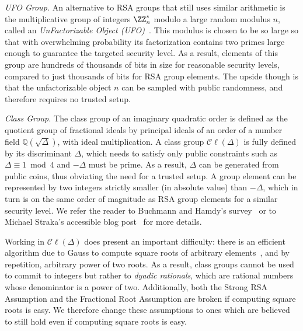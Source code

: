\documentclass{article}
\theoremstyle{definition}
\begin{document}
\textit{UFO Group.} An alternative to RSA groups that still uses similar arithmetic is the multiplicative group of integers $\ZZ_n^*$ modulo a large random modulus $n$, called an \emph{UnFactorizable Object (UFO)}~\cite{conf/icics/Sander99}. This modulus is chosen to be so large so that with overwhelming probability its factorization contains two primes large enough to guarantee the targeted security level. As a result, elements of this group are hundreds of thousands of bits in size for reasonable security levels, compared to just thousands of bits for RSA group elements. The upside though is that the unfactorizable object $n$ can be sampled with public randomness, and therefore requires no trusted setup.

\textit{Class Group.} The class group of an imaginary quadratic order is defined as the quotient group of fractional ideals by principal ideals of an order of a number field $\mathbb{Q}(\sqrt{\Delta})$, with ideal multiplication. A class group $\mathcal{C}\ell(\Delta)$ is fully defined by its discriminant $\Delta$, which needs to satisfy only public constraints such as $\Delta \equiv 1 \bmod 4$ and $-\Delta$ must be prime. As a result, $\Delta$ can be generated from public coins, thus obviating the need for a trusted setup. A group element can be represented by two integers strictly smaller (in absolute value) than $-\Delta$, which in turn is on the same order of magnitude as RSA group elements for a similar security level.  We refer the reader to Buchmann and Hamdy's survey~\cite{PKC/BucHam01} or to Michael Straka's accessible blog post~\cite{web/Stra19} for more details.

Working in $\mathcal{C}\ell(\Delta)$ does present an important difficulty: there is an efficient algorithm due to Gauss to compute square roots of arbitrary elements~\cite{jtn/BosSte96}, and by repetition, arbitrary power of two roots. As a result, class groups cannot be used to commit to integers but rather to \emph{dyadic rationals}, which are rational numbers whose denominator is a power of two.
Additionally, both the Strong RSA Assumption and the Fractional Root Assumption are broken if computing square roots is easy. We therefore change these assumptions to ones which are believed to still hold even if computing square roots is easy.
\end{document}

